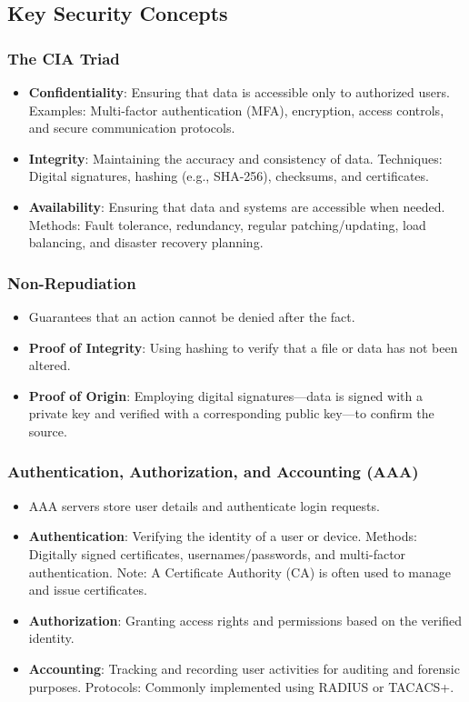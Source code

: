 \documentclass[11pt]{article}
\begin{document}
\subsection{Key Security Concepts}
\label{sec:orge1fdbef}
\subsubsection{The CIA Triad}
\label{sec:orgce1ea23}
\begin{itemize}
\item \textbf{Confidentiality}: Ensuring that data is accessible only to authorized users.
Examples: Multi-factor authentication (MFA), encryption, access controls, and secure communication protocols.
\item \textbf{Integrity}: Maintaining the accuracy and consistency of data.
Techniques: Digital signatures, hashing (e.g., SHA-256), checksums, and certificates.
\item \textbf{Availability}: Ensuring that data and systems are accessible when needed.
Methods: Fault tolerance, redundancy, regular patching/updating, load balancing, and disaster recovery planning.
\end{itemize}
\subsubsection{Non-Repudiation}
\label{sec:orge73bdc4}
\begin{itemize}
\item Guarantees that an action cannot be denied after the fact.
\item \textbf{Proof of Integrity}: Using hashing to verify that a file or data has not been altered.
\item \textbf{Proof of Origin}: Employing digital signatures—data is signed with a private key and verified with a corresponding public key—to confirm the source.
\end{itemize}
\subsubsection{Authentication, Authorization, and Accounting (AAA)}
\label{sec:org19bb086}
\begin{itemize}
\item AAA servers store user details and authenticate login requests.
\item \textbf{Authentication}: Verifying the identity of a user or device.
Methods: Digitally signed certificates, usernames/passwords, and multi-factor authentication.
Note: A Certificate Authority (CA) is often used to manage and issue certificates.
\item \textbf{Authorization}: Granting access rights and permissions based on the verified identity.
\item \textbf{Accounting}: Tracking and recording user activities for auditing and forensic purposes.
Protocols: Commonly implemented using RADIUS or TACACS+.
\end{itemize}
\end{document}
